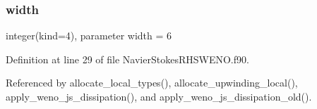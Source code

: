 \hypertarget{namespacenavierstokesrhsweno_af00ac01da0553acc8e7382cfc4a5ca1b}{}\label{namespacenavierstokesrhsweno_af00ac01da0553acc8e7382cfc4a5ca1b} 
\subsubsection{\texorpdfstring{width}{width}}
{\footnotesize\ttfamily integer(kind=4), parameter width = 6}



Definition at line 29 of file Navier\+Stokes\+R\+H\+S\+W\+E\+N\+O.\+f90.



Referenced by allocate\+\_\+local\+\_\+types(), allocate\+\_\+upwinding\+\_\+local(), apply\+\_\+weno\+\_\+js\+\_\+dissipation(), and apply\+\_\+weno\+\_\+js\+\_\+dissipation\+\_\+old().

